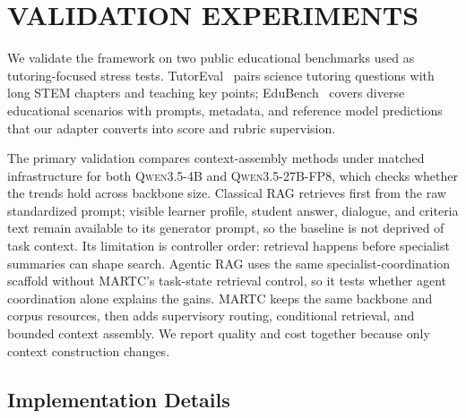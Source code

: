 \documentclass[letterpaper, 10 pt, conference]{ieeeconf}
\begin{document}
\section{VALIDATION EXPERIMENTS}
\label{sec:results}

We validate the framework on two public educational benchmarks used as tutoring-focused stress tests. TutorEval~\cite{chevalier2024sciencetutors} pairs science tutoring questions with long STEM chapters and teaching key points; EduBench~\cite{xu2025edubench} covers diverse educational scenarios with prompts, metadata, and reference model predictions that our adapter converts into score and rubric supervision.

The primary validation compares context-assembly methods under matched infrastructure for both \textsc{Qwen3.5-4B} and \textsc{Qwen3.5-27B-FP8}, which checks whether the trends hold across backbone size. Classical RAG retrieves first from the raw standardized prompt; visible learner profile, student answer, dialogue, and criteria text remain available to its generator prompt, so the baseline is not deprived of task context. Its limitation is controller order: retrieval happens before specialist summaries can shape search. Agentic RAG uses the same specialist-coordination scaffold without MARTC's task-state retrieval control, so it tests whether agent coordination alone explains the gains. \textsc{MARTC} keeps the same backbone and corpus resources, then adds supervisory routing, conditional retrieval, and bounded context assembly. We report quality and cost together because only context construction changes.

\subsection{Implementation Details}
\end{document}
